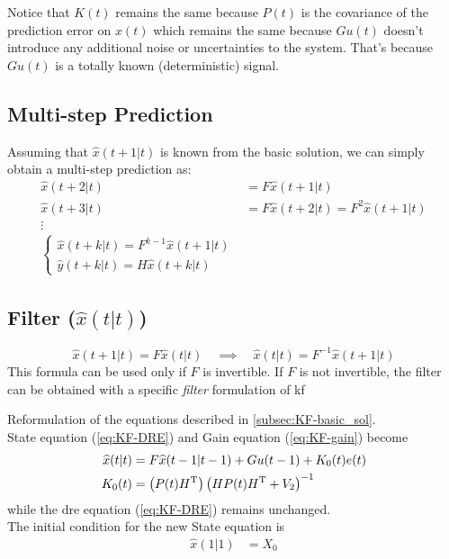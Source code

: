 Notice that $K(t)$ remains the same because $P(t)$ is the covariance of the prediction error on $x(t)$ which remains the same because $Gu(t)$ doesn't introduce any additional noise or uncertainties to the system.
That's because $Gu(t)$ is a totally known (deterministic) signal.

\subsection{Multi-step Prediction}

Assuming that $\hat{x}(t+1|t)$ is known from the basic solution, we can simply obtain a multi-step prediction as:
\begin{align*}
    \hat{x}(t+2|t) &= F \hat{x}(t+1|t) \\
    \hat{x}(t+3|t) &= F \hat{x}(t+2|t) = F^2\hat{x}(t+1|t) \\
    \vdots \\ 
    \begin{cases}
        \hat{x}(t+k|t) = F^{k-1} \hat{x}(t+1|t) \\
        \hat{y}(t+k|t) = H\hat{x}(t+k|t)
    \end{cases}
\end{align*}   


\subsection{Filter ($\hat{x}(t|t)$)}

\[
    \hat{x}(t+1|t) = F\hat{x}(t|t) \quad \implies \quad \hat{x}(t|t) = F^{-1}\hat{x}(t+1|t)
\]
This formula can be used only if $F$ is invertible.
If $F$ is not invertible, the filter can be obtained with a specific \emph{filter} formulation of \gls{kf}

\begin{definition} \label{KF-Filter_Form_sol}
    Reformulation of the equations described in \ref{subsec:KF-basic_sol}.\\
    State equation (\ref{eq:KF-DRE}) and Gain equation (\ref{eq:KF-gain}) become  
    \begin{align*}
        \widehat{x}(t|t) &= F\widehat{x}(t-1|t-1) + Gu(t-1) + K_0(t)e(t) \\
        K_0(t) &= \left(P(t)H^{\mathrm{T}}\right) \left(HP(t)H^{\mathrm{T}}+V_2\right)^{-1} \\
    \end{align*}
    while the \gls{dre} equation (\ref{eq:KF-DRE}) remains unchanged.\\
    
    The initial condition for the new State equation is 
    \begin{align*}
        \hat{x}(1|1) &= X_0 
    \end{align*}
\end{definition}

